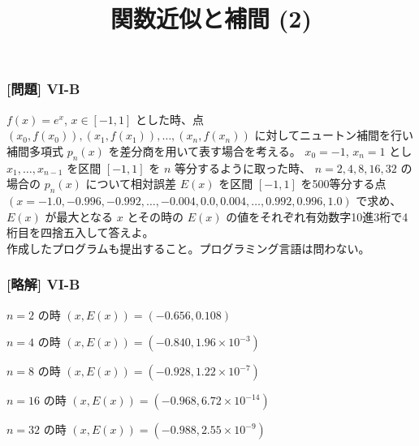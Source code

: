 \documentclass[dvipdfmx,aspectratio=169,20pt]{beamer}
\newcommand{\myfontsetting}[3]{{\fontsize{#1}{#2}\selectfont #3}}
\begin{document}
\graphicspath{{figs/}}

\begin{frame}
\frametitle{[問題] V\hspace{-.1em}I-B}

\myfontsetting{12pt}{12pt}{
$f(x)=e^x$, $x\in [-1,1]$ とした時、点 $(x_0, f(x_0)), (x_1, f(x_1)), \dots, (x_n, f(x_n))$ に対してニュートン補間を行い補間多項式 $p_n(x)$ を差分商を用いて表す場合を考える。
$x_0 = -1$, $x_n = 1$ とし $x_1, \dots, x_{n-1}$ を区間 $[-1,1]$ を $n$ 等分するように取った時、 $n=2,4,8,16,32$ の場合の $p_n(x)$ について相対誤差 $E(x)$ を区間 $[-1,1]$ を500等分する点 $(x=-1.0, -0.996, -0.992, \dots, -0.004, 0.0, 0.004, \dots, 0.992, 0.996, 1.0)$ で求め、$E(x)$ が最大となる $x$ とその時の $E(x)$ の値をそれぞれ有効数字10進3桁で4桁目を四捨五入して答えよ。
}\\
\myfontsetting{10pt}{10pt}{
作成したプログラムも提出すること。プログラミング言語は問わない。
}
\end{frame}
\begin{frame}
\frametitle{[略解] V\hspace{-.1em}I-B}
$n=2$ の時 $(x,E(x))=(-0.656, 0.108)$

$n=4$ の時 $(x,E(x))=(-0.840,1.96\times 10^{-3})$

$n=8$ の時 $(x,E(x))=(-0.928, 1.22\times 10^{-7})$

$n=16$ の時 $(x,E(x))=(-0.968, 6.72\times 10^{-14})$

$n=32$ の時 $(x,E(x))=(-0.988, 2.55\times 10^{-9})$

\end{frame}

\title{関数近似と補間 (2)}

\end{document}

